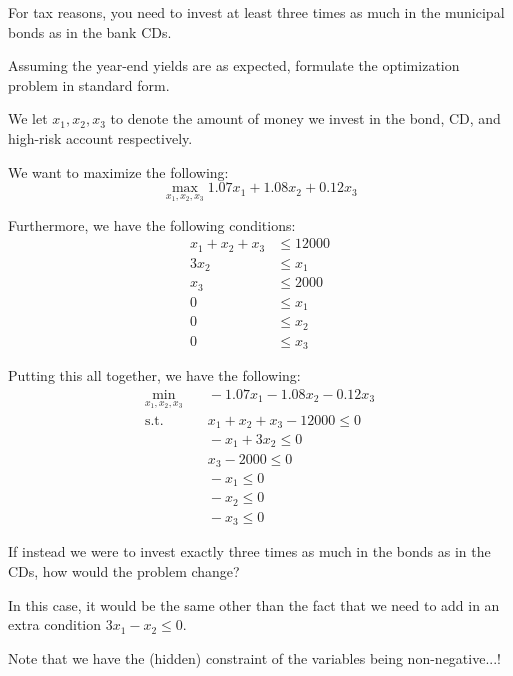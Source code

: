\documentclass[openany]{book}
\begin{document}
For tax reasons, you need to invest at least three times as much in the municipal bonds as in the bank CDs.
\begin{hw}
	Assuming the year-end yields are as expected, formulate the optimization problem in standard form.
\end{hw}
\begin{solution}
	We let $x_1, x_2, x_3$ to denote the amount of money we invest in the bond, CD, and high-risk account respectively.
	
	We want to maximize the following:
	\begin{equation*}
		\max_{x_1, x_2, x_3} 1.07x_1 + 1.08x_2 + 0.12x_3
	\end{equation*}

	Furthermore, we have the following conditions:
	\begin{align*}
		x_1 + x_2 + x_3 &\leq 12000 \\
		3x_2 &\leq x_1 \\
		x_3 &\leq 2000 \\
		0 &\leq x_1 \\
		0 &\leq x_2 \\
		0 &\leq x_3
	\end{align*}

	Putting this all together, we have the following:
	\begin{align*}
		\min_{x_1, x_2, x_3}&\quad -1.07x_1 - 1.08x_2 - 0.12x_3 \\
		\mathrm{s.t.}&\quad x_1 + x_2 + x_3 - 12000 \leq 0 \\
		&\quad -x_1 + 3x_2 \leq 0 \\
		&\quad x_3 - 2000 \leq 0 \\
		&\quad -x_1 \leq 0 \\
		&\quad -x_2 \leq 0 \\
		&\quad -x_3 \leq 0
	\end{align*}
\end{solution}

\begin{hw}
	If instead we were to invest exactly three times as much in the bonds as in the CDs, how would the problem change?
\end{hw}
\begin{solution}
	In this case, it would be the same other than the fact that we need to add in an extra condition $3x_1 - x_2 \leq 0$.
\end{solution}

\begin{warn}
	Note that we have the (hidden) constraint of the variables being non-negative...!
\end{warn}
\end{document}
